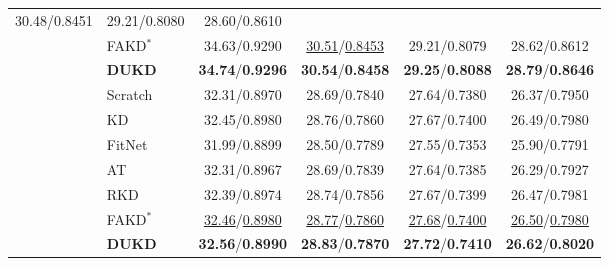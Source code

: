 \documentclass[10pt,twocolumn,letterpaper]{article}
\begin{document}
\begin{table}[]
{\begin{tabular}{@{\hspace{2pt}}l@{\hspace{1.5\tabcolsep}}lcccc@{\hspace{2pt}}}
  30.48/0.8451 &
  29.21/0.8080 &
  28.60/0.8610 \\
 &
  FAKD$^\ast$ &
  34.63/0.9290 &
  \underline{30.51}/\underline{0.8453} &
  29.21/0.8079 &
  28.62/0.8612 \\
 &
  \textbf{DUKD} &
  \textbf{34.74}/\textbf{0.9296} &
  \textbf{30.54}/\textbf{0.8458} &
  \textbf{29.25}/\textbf{0.8088} &
  \textbf{28.79}/\textbf{0.8646} \\ \midrule
\multirow{7}{*}{\texttimes4} &
  Scratch &
  32.31/0.8970 &
  28.69/0.7840 &
  27.64/0.7380 &
  26.37/0.7950 \\
 &
  KD &
  32.45/0.8980 &
  28.76/0.7860 &
  27.67/0.7400 &
  26.49/0.7980 \\
 &
  FitNet &
  31.99/0.8899 &
  28.50/0.7789 &
  27.55/0.7353 &
  25.90/0.7791 \\
 &
  AT &
  32.31/0.8967 &
  28.69/0.7839 &
  27.64/0.7385 &
  26.29/0.7927 \\
 &
  RKD &
  32.39/0.8974 &
  28.74/0.7856 &
  27.67/0.7399 &
  26.47/0.7981 \\
 &
  FAKD$^\ast$ &
  \underline{32.46}/\underline{0.8980} &
  \underline{28.77}/\underline{0.7860} &
  \underline{27.68}/\underline{0.7400} &
  \underline{26.50}/\underline{0.7980} \\
 &
  \textbf{DUKD} &
  \textbf{32.56}/\textbf{0.8990} &
  \textbf{28.83}/\textbf{0.7870} &
  \textbf{27.72}/\textbf{0.7410} &
  \textbf{26.62}/\textbf{0.8020} \\ \bottomrule
\end{tabular}}
\end{table}
\end{document}
